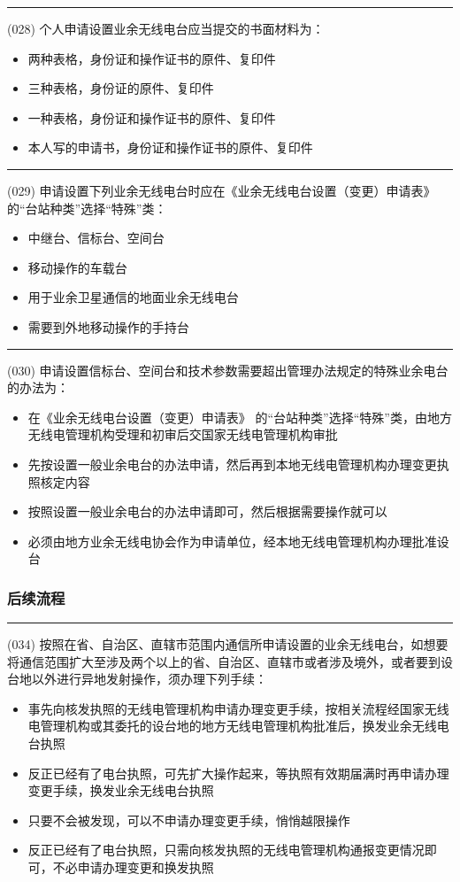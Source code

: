 \documentclass[twocolumn,hyperref,UTF8]{ctexart}  %
\begin{document}
\noindent\rule{0.5\textwidth}{1pt}
\heiti (028) 个人申请设置业余无线电台应当提交的书面材料为： \songti {\color{gray} [LK0023] }
\begin{itemize}
	\item  两种表格，身份证和操作证书的原件、复印件
	\item  三种表格，身份证的原件、复印件
	\item  一种表格，身份证和操作证书的原件、复印件
	\item  本人写的申请书，身份证和操作证书的原件、复印件
\end{itemize}


\noindent\rule{0.5\textwidth}{1pt}
\heiti (029) 申请设置下列业余无线电台时应在《业余无线电台设置（变更）申请表》 的“台站种类”选择“特殊”类： \songti {\color{gray} [LK0028] }
\begin{itemize}
	\item  中继台、信标台、空间台
	\item  移动操作的车载台
	\item  用于业余卫星通信的地面业余无线电台
	\item  需要到外地移动操作的手持台
\end{itemize}


\noindent\rule{0.5\textwidth}{1pt}
\heiti (030) 申请设置信标台、空间台和技术参数需要超出管理办法规定的特殊业余电台的办法为： \songti {\color{gray} [LK0029] }
\begin{itemize}
	\item  在《业余无线电台设置（变更）申请表》 的“台站种类”选择“特殊”类，由地方无线电管理机构受理和初审后交国家无线电管理机构审批
	\item  先按设置一般业余电台的办法申请，然后再到本地无线电管理机构办理变更执照核定内容
	\item  按照设置一般业余电台的办法申请即可，然后根据需要操作就可以
	\item  必须由地方业余无线电协会作为申请单位，经本地无线电管理机构办理批准设台
\end{itemize}


\subsubsection{后续流程}


\noindent\rule{0.5\textwidth}{1pt}
\heiti (034) 按照在省、自治区、直辖市范围内通信所申请设置的业余无线电台，如想要将{\color{cyan}通信范围扩大}至涉及两个以上的省、自治区、直辖市或者涉及境外，或者要{\color{cyan}到设台地以外进行异地发射操作}，须办理下列手续： \songti {\color{gray} [LK0033] }
\begin{itemize}
	\item  事先向核发执照的无线电管理机构申请办理变更手续，按相关流程经国家无线电管理机构或其委托的设台地的地方无线电管理机构批准后，换发业余无线电台执照
	\item  反正已经有了电台执照，可先扩大操作起来，等执照有效期届满时再申请办理变更手续，换发业余无线电台执照
	\item  只要不会被发现，可以不申请办理变更手续，悄悄越限操作
	\item  反正已经有了电台执照，只需向核发执照的无线电管理机构通报变更情况即可，不必申请办理变更和换发执照
\end{itemize}
\end{document}
